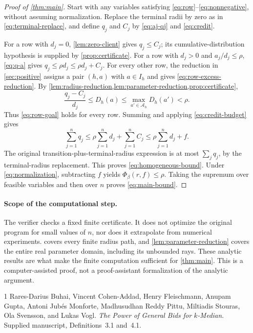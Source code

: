 \documentclass[11pt]{article}
\theoremstyle{definition}
\theoremstyle{remark}
\newcommand{\paramset}{\mathcal A}
\begin{document}
\begin{proof}[Proof of \cref{thm:main}]
Start with any variables satisfying
\eqref{eq:row}--\eqref{eq:nonnegative}, without assuming normalization.
Replace the terminal radii by zero as in
\eqref{eq:terminal-replace}, and define $q_j$ and $C_j$ by
\eqref{eq:aj-qj} and \eqref{eq:credit}.

For a row with $d_j=0$, \cref{lem:zero-client} gives $q_j\le C_j$;
its cumulative-distribution hypothesis is supplied by
\cref{prop:certificate}.
For a row with $d_j>0$ and $a_j/d_j\le\rho$, \eqref{eq:q-a} gives
$q_j\le\rho d_j\le\rho d_j+C_j$.
For every other row, the reduction in \cref{sec:positive} assigns a pair
$(h,a)$ with $a\in I_h$ and gives \eqref{eq:row-excess-reduction}.
By \cref{lem:radius-reduction,lem:parameter-reduction,prop:certificate},
\[
  \frac{q_j-C_j}{d_j}
     \le D_h(a)
     \le\max_{a'\in\paramset_h}D_h(a')
     <\rho.
\]
Thus \eqref{eq:row-goal} holds for every row. Summing and applying
\eqref{eq:credit-budget} gives
\[
  \sum_{j=1}^n q_j
     \le\rho\sum_{j=1}^n d_j+\sum_{j=1}^n C_j
     \le\rho\sum_{j=1}^n d_j+f.
\]
The original transition-plus-terminal-radius expression is at most
$\sum_jq_j$, by the terminal-radius replacement. This proves
\eqref{eq:homogeneous-bound}.
Under \eqref{eq:normalization}, subtracting $f$ yields
$\Phi_\beta(r,f)\le\rho$. Taking the supremum over feasible variables and
then over $n$ proves \eqref{eq:main-bound}.
\end{proof}

\paragraph{Scope of the computational step.}
The verifier checks a fixed finite certificate. It does not optimize the
original program for small values of $n$, nor does it extrapolate from
numerical experiments.  covers every finite
radius path, and \cref{lem:parameter-reduction} covers the entire real
parameter domain, including its unbounded rays. These analytic results
are what make the finite computation sufficient for \cref{thm:main}.
This is a computer-assisted proof, not a proof-assistant formalization of
the analytic argument.

\begin{thebibliography}{1}
Rares-Darius Buhai, Vincent Cohen-Addad, Henry Fleischmann, Anupam Gupta,
Antoni Jub\'es Monforte, Madhusudhan Reddy Pittu, Miltiadis Stouras,
Ola Svensson, and Lukas Vogl.
\newblock \emph{The Power of General Bids for $k$-Median}.
\newblock Supplied manuscript, Definitions~3.1 and~4.1.
\end{thebibliography}
\end{document}
